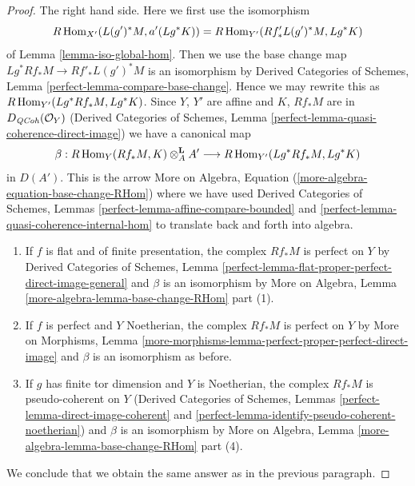 \begin{proof}
\medskip\noindent
The right hand side. Here we first use the isomorphism
$$
R\mathop{\mathrm{Hom}}\nolimits_{X'}(L(g')^*M, a'(Lg^*K)) = R\mathop{\mathrm{Hom}}\nolimits_{Y'}(Rf'_*L(g')^*M, Lg^*K)
$$
of Lemma \ref{lemma-iso-global-hom}. Then we use the base change
map $Lg^*Rf_*M \to Rf'_*L(g')^*M$ is an isomorphism by
Derived Categories of Schemes, Lemma \ref{perfect-lemma-compare-base-change}.
Hence we may rewrite this as $R\mathop{\mathrm{Hom}}\nolimits_{Y'}(Lg^*Rf_*M, Lg^*K)$.
Since $Y$, $Y'$ are affine and $K$, $Rf_*M$ are in $D_{\mathit{QCoh}}(\mathcal{O}_Y)$
(Derived Categories of Schemes, Lemma
\ref{perfect-lemma-quasi-coherence-direct-image})
we have a canonical map
$$
\beta :
R\mathop{\mathrm{Hom}}\nolimits_Y(Rf_*M, K) \otimes^\mathbf{L}_A A'
\longrightarrow
R\mathop{\mathrm{Hom}}\nolimits_{Y'}(Lg^*Rf_*M, Lg^*K)
$$
in $D(A')$. This is the arrow
More on Algebra, Equation (\ref{more-algebra-equation-base-change-RHom})
where we have used Derived Categories of Schemes, Lemmas
\ref{perfect-lemma-affine-compare-bounded} and
\ref{perfect-lemma-quasi-coherence-internal-hom}
to translate back and forth into algebra.
\begin{enumerate}
\item If $f$ is flat and of finite presentation, the complex $Rf_*M$
is perfect on $Y$ by Derived Categories of Schemes, Lemma
\ref{perfect-lemma-flat-proper-perfect-direct-image-general}
and $\beta$ is an isomorphism by
More on Algebra, Lemma \ref{more-algebra-lemma-base-change-RHom} part (1).
\item If $f$ is perfect and $Y$ Noetherian, the complex $Rf_*M$
is perfect on $Y$ by More on Morphisms, Lemma
\ref{more-morphisms-lemma-perfect-proper-perfect-direct-image}
and $\beta$ is an isomorphism as before.
\item If $g$ has finite tor dimension and $Y$ is Noetherian,
the complex $Rf_*M$ is pseudo-coherent on $Y$
(Derived Categories of Schemes, Lemmas
\ref{perfect-lemma-direct-image-coherent} and
\ref{perfect-lemma-identify-pseudo-coherent-noetherian})
and $\beta$ is an isomorphism by
More on Algebra, Lemma \ref{more-algebra-lemma-base-change-RHom} part (4).
\end{enumerate}
We conclude that we obtain the same answer as in the previous paragraph.


\end{proof}
